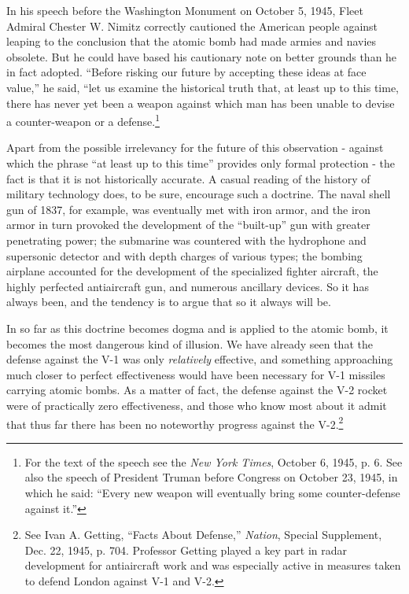 In his speech before the Washington Monument on October 5, 1945, Fleet Admiral Chester W. Nimitz correctly cautioned the American people against leaping to the conclusion that the atomic bomb had made armies and navies obsolete. But he could have based his cautionary note on better grounds than he in fact adopted. ``Before risking our future by accepting these ideas at face value,'' he said, ``let us examine the historical truth that, at least up to this time, there has never yet been a weapon against which man has been unable to devise a counter-weapon or a defense.\footnote{For the text of the speech see the \textit{New York Times}, October 6, 1945, p. 6. See also the speech of President Truman before Congress on October 23, 1945, in which he said: ``Every new weapon will eventually bring some counter-defense against it.''}

Apart from the possible irrelevancy for the future of this observation - against which the phrase ``at least up to this time'' provides only formal protection - the fact is that it is not historically accurate. A casual reading of the history of military technology does, to be sure, encourage such a doctrine. The naval shell gun of 1837, for example, was eventually met with iron armor, and the iron armor in turn provoked the development of the ``built-up'' gun with greater penetrating power; the submarine was countered with the hydrophone and supersonic detector and with depth charges of various types; the bombing airplane accounted for the development of the specialized fighter aircraft, the highly perfected antiaircraft gun, and numerous ancillary devices. So it has always been, and the tendency is to argue that so it always will be.

In so far as this doctrine becomes dogma and is applied to the atomic bomb, it becomes the most dangerous kind of illusion. We have already seen that the defense against the V-1 was only \emph{relatively} effective, and something approaching much closer to perfect effectiveness would have been necessary for V-1 missiles carrying atomic bombs. As a matter of fact, the defense against the V-2 rocket were of practically zero effectiveness, and those who know most about it admit that thus far there has been no noteworthy progress against the V-2.\footnote{See Ivan A. Getting, ``Facts About Defense,'' \textit{Nation}, Special Supplement, Dec. 22, 1945, p. 704. Professor Getting played a key part in radar development for antiaircraft work and was especially active in measures taken to defend London against V-1 and V-2.}


